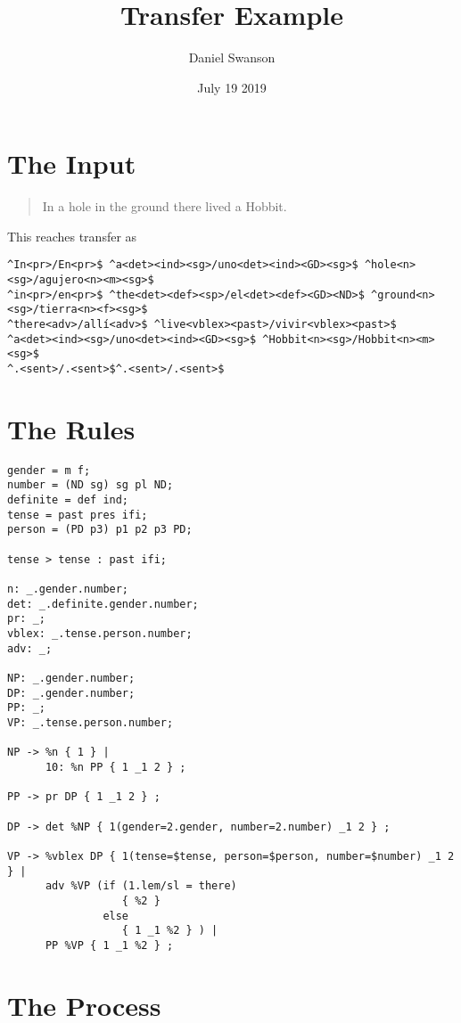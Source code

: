 \documentclass{article}
\title{Transfer Example}
\author{Daniel Swanson}
\date{July 19 2019}
\begin{document}
\maketitle

\section{The Input}

\begin{quote}
    In a hole in the ground there lived a Hobbit.
\end{quote}

This reaches transfer as

\begin{verbatim}
^In<pr>/En<pr>$ ^a<det><ind><sg>/uno<det><ind><GD><sg>$ ^hole<n><sg>/agujero<n><m><sg>$
^in<pr>/en<pr>$ ^the<det><def><sp>/el<det><def><GD><ND>$ ^ground<n><sg>/tierra<n><f><sg>$
^there<adv>/allí<adv>$ ^live<vblex><past>/vivir<vblex><past>$ 
^a<det><ind><sg>/uno<det><ind><GD><sg>$ ^Hobbit<n><sg>/Hobbit<n><m><sg>$
^.<sent>/.<sent>$^.<sent>/.<sent>$
\end{verbatim}

\clearpage
\section{The Rules}

\begin{verbatim}
gender = m f;
number = (ND sg) sg pl ND;
definite = def ind;
tense = past pres ifi;
person = (PD p3) p1 p2 p3 PD;

tense > tense : past ifi;

n: _.gender.number;
det: _.definite.gender.number;
pr: _;
vblex: _.tense.person.number;
adv: _;

NP: _.gender.number;
DP: _.gender.number;
PP: _;
VP: _.tense.person.number;

NP -> %n { 1 } |
      10: %n PP { 1 _1 2 } ;

PP -> pr DP { 1 _1 2 } ;

DP -> det %NP { 1(gender=2.gender, number=2.number) _1 2 } ;

VP -> %vblex DP { 1(tense=$tense, person=$person, number=$number) _1 2 } |
      adv %VP (if (1.lem/sl = there) 
                  { %2 }
               else
                  { 1 _1 %2 } ) |
      PP %VP { 1 _1 %2 } ;
\end{verbatim}

\clearpage
\section{The Process}
\end{document}
